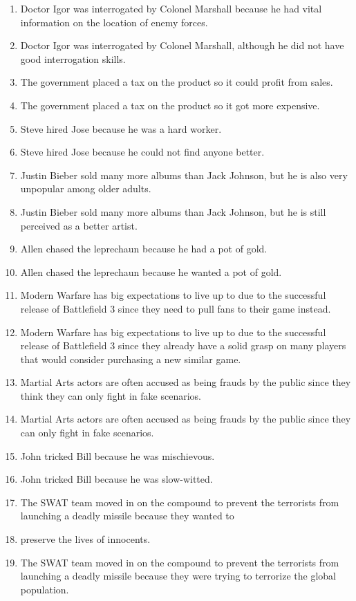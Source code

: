 \documentclass{article}
\begin{document}
\begin{enumerate}
	\item Doctor Igor was interrogated by Colonel Marshall because he had vital information on the location of enemy forces.
	\item Doctor Igor was interrogated by Colonel Marshall, although he did not have good interrogation skills.
	\item The government placed a tax on the product so it could profit from sales.
	\item The government placed a tax on the product so it got more expensive.
	\item Steve hired Jose because he was a hard worker.
	\item Steve hired Jose because he could not find anyone better.
	\item Justin Bieber sold many more albums than Jack Johnson, but he is also very unpopular among older adults.
	\item Justin Bieber sold many more albums than Jack Johnson, but he is still perceived as a better artist.
	\item Allen chased the leprechaun because he had a pot of gold.
	\item Allen chased the leprechaun because he wanted a pot of gold.
	\item Modern Warfare has big expectations to live up to due to the successful release of Battlefield 3 since they need to pull fans to their game instead.
	\item Modern Warfare has big expectations to live up to due to the successful release of Battlefield 3 since they already have a solid grasp on many players that would consider purchasing a new similar game.
	\item Martial Arts actors are often accused as being frauds by the public since they think they can only fight in fake scenarios.
	\item Martial Arts actors are often accused as being frauds by the public since they can only fight in fake scenarios.
	\item John tricked Bill because he was mischievous.
	\item John tricked Bill because he was slow-witted.
	\item The SWAT team moved in on the compound to prevent the terrorists from launching a deadly missile because they wanted to \item preserve the lives of innocents.
	\item The SWAT team moved in on the compound to prevent the terrorists from launching a deadly missile because they were trying to terrorize the global population.

\end{enumerate}
\end{document}
